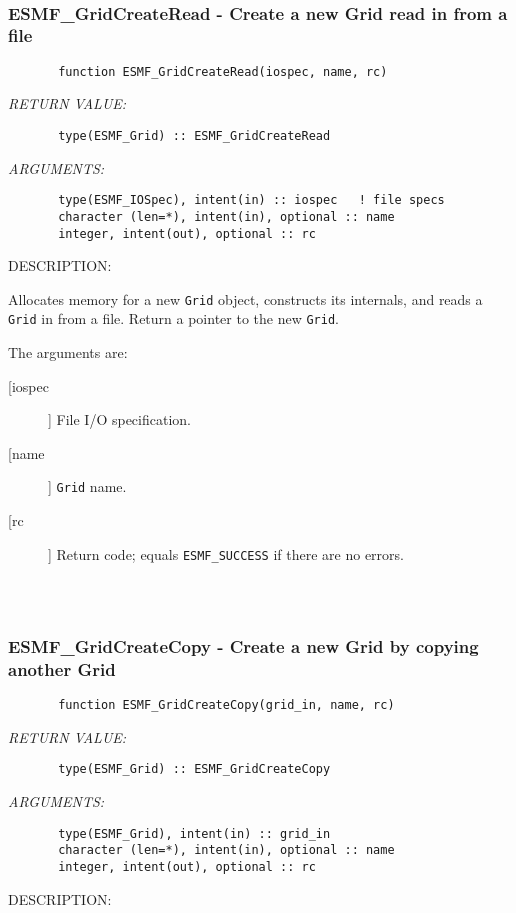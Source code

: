  
\mbox{}\hrulefill\ 
 
\subsubsection{ESMF\_GridCreateRead - Create a new Grid read in from a file}


\begin{verbatim}       function ESMF_GridCreateRead(iospec, name, rc)\end{verbatim}{\em RETURN VALUE:}
\begin{verbatim}       type(ESMF_Grid) :: ESMF_GridCreateRead\end{verbatim}{\em ARGUMENTS:}
\begin{verbatim}       type(ESMF_IOSpec), intent(in) :: iospec   ! file specs
       character (len=*), intent(in), optional :: name
       integer, intent(out), optional :: rc\end{verbatim}
{\sf DESCRIPTION:\\ }


       Allocates memory for a new {\tt Grid} object, constructs its
       internals, and reads a {\tt Grid} in from a file.  Return a pointer to
       the new {\tt Grid}.
  
       The arguments are:
       \begin{description}
       \item[[iospec]]
            File I/O specification.
       \item[[name]]
            {\tt Grid} name.
       \item[[rc]]
            Return code; equals {\tt ESMF\_SUCCESS} if there are no errors.
     \end{description}
  
\begin{verbatim} \end{verbatim}
 
 
\mbox{}\hrulefill\ 
 
\subsubsection{ESMF\_GridCreateCopy - Create a new Grid by copying another Grid}


\begin{verbatim}       function ESMF_GridCreateCopy(grid_in, name, rc)\end{verbatim}{\em RETURN VALUE:}
\begin{verbatim}       type(ESMF_Grid) :: ESMF_GridCreateCopy\end{verbatim}{\em ARGUMENTS:}
\begin{verbatim}       type(ESMF_Grid), intent(in) :: grid_in
       character (len=*), intent(in), optional :: name
       integer, intent(out), optional :: rc\end{verbatim}
{\sf DESCRIPTION:\\ }


